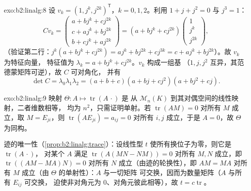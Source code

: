 \begin{solution}{exo:b2:linalg:8}
设 $v_k = (1, j^k, j^{2k})^{\mathsf T}$，$k = 0, 1, 2$。利用 $1
+ j + j^2 = 0$ 与 $j^3 = 1$：
\[
C v_k =
\begin{pmatrix}
a + b j^k + c j^{2k}\\
c + a j^k + b j^{2k}\\
b + c j^k + a j^{2k}
\end{pmatrix}
= (a + b j^k + c j^{2k})
\begin{pmatrix} 1\\ j^k\\ j^{2k}\end{pmatrix},
\]
（验证第二行：$j^k(a + bj^k + cj^{2k}) = aj^k + bj^{2k} +
cj^{3k} = c + aj^k + bj^{2k}$）。故 $v_k$ 为特征向量，
特征值为 $\lambda_k = a + bj^k + cj^{2k}$。$v_k$ 构成一组基
（$1, j, j^2$ 互异，其范德蒙矩阵可逆），故 $C$ 可对角化，
并有
\[
\det C = \lambda_0\lambda_1\lambda_2
= (a+b+c)(a + bj + cj^2)(a + bj^2 + cj).
\]
\end{solution}

\begin{solution}{exo:b2:linalg:9}
映射 $\Theta \colon A \mapsto \operatorname{tr}(A\,\cdot)$ 是
从 $\mathcal{M}_n(K)$ 到其对偶空间的线性映射，二者维数相等，
均为 $n^2$，只需证明单射。若 $\operatorname{tr}(AM) =
0$ 对所有 $M$ 成立，取 $M = E_{ji}$，则 $\operatorname{tr}(A E_{ji}) =
a_{ij} = 0$ 对所有 $i, j$ 成立，于是 $A = 0$，故 $\Theta$ 为同构。

迹的唯一性（\cref{prop:b2:linalg:trace}）：设线性型 $t$
使所有换位子为零，则它是 $\operatorname{tr}(A\,\cdot)$，
对某个 $A$ 满足 $\operatorname{tr}(A(MN - NM)) = 0$ 对所有 $M, N$ 成立，即
$\operatorname{tr}((AM - MA)N) = 0$ 对所有 $N$ 成立（由迹的轮换性），即
$AM = MA$ 对所有 $M$ 成立（由 $\Theta$ 的单射性）：$A$ 与一切矩阵
可交换，因而为数量矩阵（$A$ 与所有 $E_{ij}$ 可交换，
迫使非对角元为 $0$、对角元彼此相等），故 $t = c
\operatorname{tr}$。
\end{solution}

